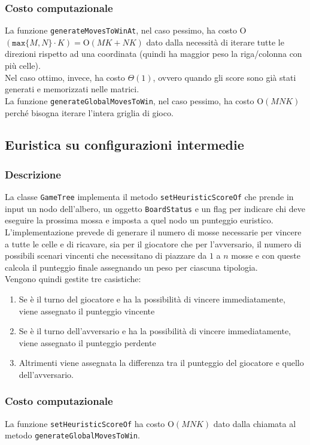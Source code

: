 \documentclass[11pt]{article}
\begin{document}
\subsubsection*{Costo computazionale}
La funzione \texttt{generateMovesToWinAt}, nel caso pessimo, ha costo O$(\texttt{max}\{M, N\} \cdot K) = \text{O}(MK+NK)$ dato dalla necessità di iterare tutte le direzioni rispetto ad una coordinata (quindi ha maggior peso la riga/colonna con più celle).\\
Nel caso ottimo, invece, ha costo $\Theta(1)$, ovvero quando gli score sono già stati generati e memorizzati nelle matrici.\\
La funzione \texttt{generateGlobalMovesToWin}, nel caso pessimo, ha costo O$(MNK)$ perché bisogna iterare l'intera griglia di gioco.

\subsection*{Euristica su configurazioni intermedie}
\subsubsection*{Descrizione}
La classe \texttt{GameTree} implementa il metodo \texttt{setHeuristicScoreOf} che prende in input un nodo dell'albero, un oggetto \texttt{BoardStatus} e un flag per indicare chi deve eseguire la prossima mossa e imposta a quel nodo un punteggio euristico.\\
L'implementazione prevede di generare il numero di mosse necessarie per vincere a tutte le celle e di ricavare, sia per il giocatore che per l'avversario, il numero di possibili scenari vincenti che necessitano di piazzare da $1$ a $n$ mosse e con queste calcola il punteggio finale assegnando un peso per ciascuna tipologia.\\
Vengono quindi gestite tre casistiche: 
\begin{enumerate}
\setlength\itemsep{0.05cm}
	\item Se è il turno del giocatore e ha la possibilità di vincere immediatamente, viene assegnato il punteggio vincente
	\item Se è il turno dell'avversario e ha la possibilità di vincere immediatamente, viene assegnato il punteggio perdente
	\item Altrimenti viene assegnata la differenza tra il punteggio del giocatore e quello dell'avversario.
\end{enumerate}
\subsubsection*{Costo computazionale}
La funzione \texttt{setHeuristicScoreOf} ha costo O$(MNK)$ dato dalla chiamata al metodo \texttt{generateGlobalMovesToWin}.
\end{document}
